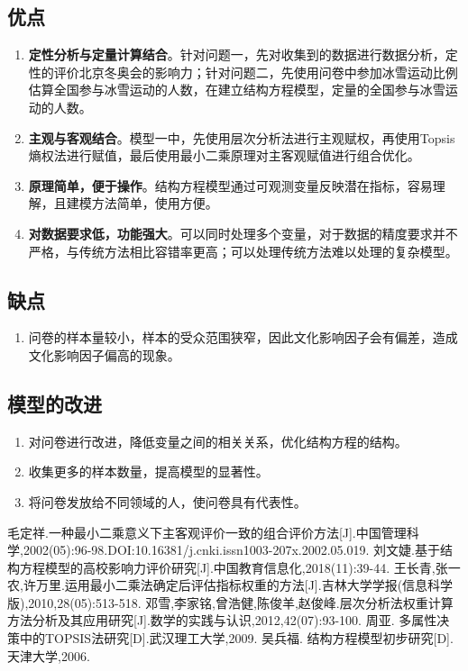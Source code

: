 \documentclass[withoutpreface,bwprint]{cumcmthesis} %
\begin{document}
\subsection{优点}
\begin{enumerate}
	\item  \textbf{定性分析与定量计算结合}。针对问题一，先对收集到的数据进行数据分析，定性的评价北京冬奥会的影响力；针对问题二，先使用问卷中参加冰雪运动比例估算全国参与冰雪运动的人数，在建立结构方程模型，定量的全国参与冰雪运动的人数。
	\item \textbf{主观与客观结合}。模型一中，先使用层次分析法进行主观赋权，再使用Topsis熵权法进行赋值，最后使用最小二乘原理对主客观赋值进行组合优化。
	\item \textbf{原理简单，便于操作}。结构方程模型通过可观测变量反映潜在指标，容易理解，且建模方法简单，使用方便。
	\item \textbf{对数据要求低，功能强大}。可以同时处理多个变量，对于数据的精度要求并不严格，与传统方法相比容错率更高；可以处理传统方法难以处理的复杂模型。
\end{enumerate}

\subsection{缺点}
\begin{enumerate}
	\item 问卷的样本量较小，样本的受众范围狭窄，因此文化影响因子会有偏差，造成文化影响因子偏高的现象。
\end{enumerate}
\subsection{模型的改进}
\begin{enumerate}
	\item 对问卷进行改进，降低变量之间的相关关系，优化结构方程的结构。
	\item 收集更多的样本数量，提高模型的显著性。
	\item 将问卷发放给不同领域的人，使问卷具有代表性。
\end{enumerate}



\begin{thebibliography}{9}%
    毛定祥.一种最小二乘意义下主客观评价一致的组合评价方法[J].中国管理科学,2002(05):96-98.DOI:10.16381/j.cnki.issn1003-207x.2002.05.019.
    刘文婕.基于结构方程模型的高校影响力评价研究[J].中国教育信息化,2018(11):39-44.
    王长青,张一农,许万里.运用最小二乘法确定后评估指标权重的方法[J].吉林大学学报(信息科学版),2010,28(05):513-518.
	邓雪,李家铭,曾浩健,陈俊羊,赵俊峰.层次分析法权重计算方法分析及其应用研究[J].数学的实践与认识,2012,42(07):93-100.
	周亚. 多属性决策中的TOPSIS法研究[D].武汉理工大学,2009.
	吴兵福. 结构方程模型初步研究[D].天津大学,2006.
\end{thebibliography}

\newpage
\end{document}
